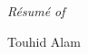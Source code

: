 \section{}

\begin{center}
\end{center}
\begin{center}
  \textit{R\'esum\'e of}\begin{huge}
    {Touhid Alam}
  \end{huge}
\end{center}
